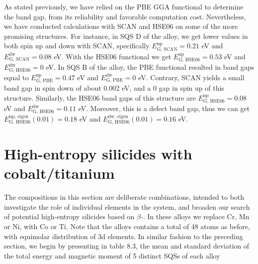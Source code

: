 As stated previously, we have relied on the PBE GGA functional to determine the band gap, from its reliability and favorable computation cost. Nevertheless, we have conducted calculations with SCAN and HSE06 on some of the more promising structures. For instance, in SQS D of the  alloy, we get lower values in both spin up and down with SCAN, specifically $E_\text{G, SCAN} ^\text{up}= 0.21$ eV and $E_\text{G, SCAN} ^\text{dw} = 0.08$ eV. With the HSE06 functional we get $E_\text{G, HSE06} ^\text{up} = 0.53$ eV and $E_\text{G, HSE06} ^\text{dw} = 0$ eV. In SQS B of the  alloy, the PBE functional resulted in band gaps equal to $E_\text{G, PBE} ^\text{up} = 0.47$ eV and $E_\text{G, PBE} ^\text{dw} = 0$ eV. Contrary, SCAN yields a small band gap in spin down of about 0.002 eV, and a 0 gap in spin up of this structure. Similarly, the HSE06 band gaps of this structure are $E_\text{G, HSE06} ^\text{up} = 0.08$ eV and $E_\text{G, HSE06} ^\text{dw} = 0.11$ eV. Moreover, this is a defect band gap, thus we can get $E_\text{G, HSE06} ^\text{up, eigen}(0.01) = 0.18$ eV and $E_\text{G, HSE06} ^\text{dw, eigen}(0.01) = 0.16$ eV.  

\newpage
\section{High-entropy silicides with cobalt/titanium}

The compositions in this section are deliberate combinations, intended to both investigate the role of individual elements in the  system, and broaden our search of potential high-entropy silicides based on $\beta$-. In these alloys we replace Cr, Mn or Ni, with Co or Ti. Note that the alloys contains a total of 48 atoms as before, with equimolar distribution of 3d elements. In similar fashion to the preceding section, we begin by presenting in table 8.3, the mean and standard deviation of the total energy and magnetic moment of 5 distinct SQSs of each alloy

